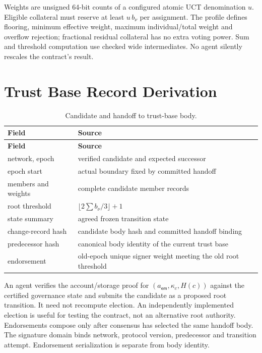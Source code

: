 Weights are unsigned 64-bit counts of a configured atomic UCT denomination $u$. Eligible collateral must reserve at least $u\,b_\nu$ per assignment. The profile defines flooring, minimum effective weight, maximum individual/total weight and overflow rejection; fractional residual collateral has no extra voting power. Sum and threshold computation use checked wide intermediates. No agent silently rescales the contract's result.

\section{Trust Base Record Derivation}\label{app:gov-trust-base}

\begin{longtable}{p{3.6cm}p{9.6cm}}
\caption{Candidate and handoff to trust-base body.}\label{ta:gov-derive}\\
\textbf{Field} & \textbf{Source}\\ \hline
\endfirsthead
\textbf{Field} & \textbf{Source}\\ \hline
\endhead
network, epoch & verified candidate and expected successor\\
epoch start & actual boundary fixed by committed handoff\\
members and weights & complete candidate member records\\
root threshold & $\lfloor2\sum b_\nu/3\rfloor+1$\\
state summary & agreed frozen transition state\\
change-record hash & candidate body hash and committed handoff binding\\
predecessor hash & canonical body identity of the current trust base\\
endorsement & old-epoch unique signer weight meeting the old root threshold\\
\end{longtable}

An agent verifies the account/storage proof for $(a_\mathsf{em},\kappa_c,H(c))$ against the certified governance state and submits the candidate as a proposed root transition. It need not recompute election. An independently implemented election is useful for testing the contract, not an alternative root authority. Endorsements compose only after consensus has selected the same handoff body. The signature domain binds network, protocol version, predecessor and transition attempt. Endorsement serialization is separate from body identity.

